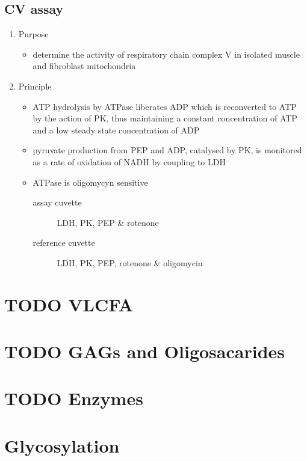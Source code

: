 \documentclass{scrartcl}
\begin{document}
\subsection{CV assay}
\label{sec:orgadfced2}
\begin{enumerate}
\item Purpose
\label{sec:org319c52e}
\begin{itemize}
\item determine the activity of respiratory chain complex V in isolated
muscle and fibroblast mitochondria
\end{itemize}

\item Principle
\label{sec:orgf51875d}
\begin{itemize}
\item ATP hydrolysis by ATPase liberates ADP which is reconverted to ATP
by the action of PK, thus maintaining a constant concentration of
ATP and a low steady state concentration of ADP
\item pyruvate production from PEP and ADP, catalysed by PK, is monitored
as a rate of oxidation of NADH by coupling to LDH
\item ATPase is oligomycyn sensitive
\begin{description}
\item[{assay cuvette}] LDH, PK, PEP \& rotenone
\item[{reference cuvette}] LDH, PK, PEP, rotenone \& oligomycin
\end{description}
\end{itemize}


\end{enumerate}
\section{{\bfseries\sffamily TODO} VLCFA}
\label{sec:orgd1a1cae}
\section{{\bfseries\sffamily TODO} GAGs and Oligosacarides}
\label{sec:org31630fa}
\section{{\bfseries\sffamily TODO} Enzymes}
\label{sec:org5661236}
\section{Glycosylation}
\label{sec:org07b60a1}
\end{document}
